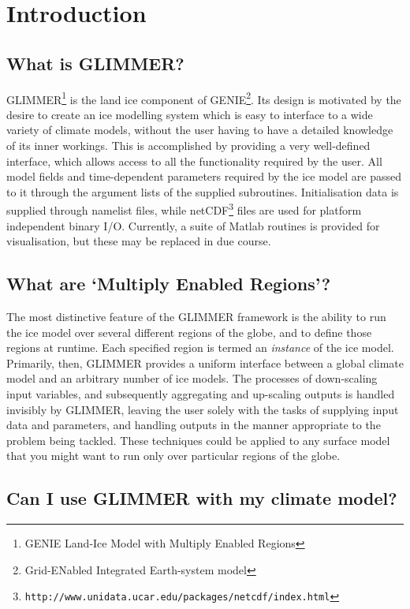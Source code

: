 \section{Introduction}

\subsection{What is GLIMMER?}

GLIMMER\footnote{GENIE Land-Ice Model with Multiply Enabled
Regions} is the land ice component of GENIE\footnote{Grid-ENabled
Integrated Earth-system model}. Its design is motivated by the desire to
create an ice modelling system which is easy to interface to a wide variety of
climate models, without 
the user having to have a detailed knowledge of its inner workings. This is
accomplished by providing a very well-defined interface, which allows access to
all the functionality required by the user. All model fields and
time-dependent parameters required by the ice model are passed to it through
the argument lists of the supplied subroutines. Initialisation data is
supplied through namelist files, while netCDF\footnote{\texttt{http://www.unidata.ucar.edu/packages/netcdf/index.html}} 
files are used for platform independent binary I/O. 
Currently, a suite of Matlab routines is provided for visualisation,
but these may be replaced in due course.

\subsection{What are `Multiply Enabled Regions'?}

The most distinctive feature of the GLIMMER framework is the ability to
run the ice model over several different regions of the globe, and to define
those regions at runtime. Each specified region is termed an \emph{instance}
of the ice model. Primarily, then, GLIMMER provides a uniform interface
between a global climate model and an arbitrary number of ice models. The
processes of down-scaling input variables, and subsequently aggregating and
up-scaling outputs is handled invisibly by GLIMMER, leaving the user solely
with the tasks of supplying input data and parameters, and handling outputs in
the manner appropriate to the problem being tackled. These techniques could be
applied to any surface model that you might want to run only over
particular regions of the globe.

\subsection{Can I use GLIMMER with my climate model?}

